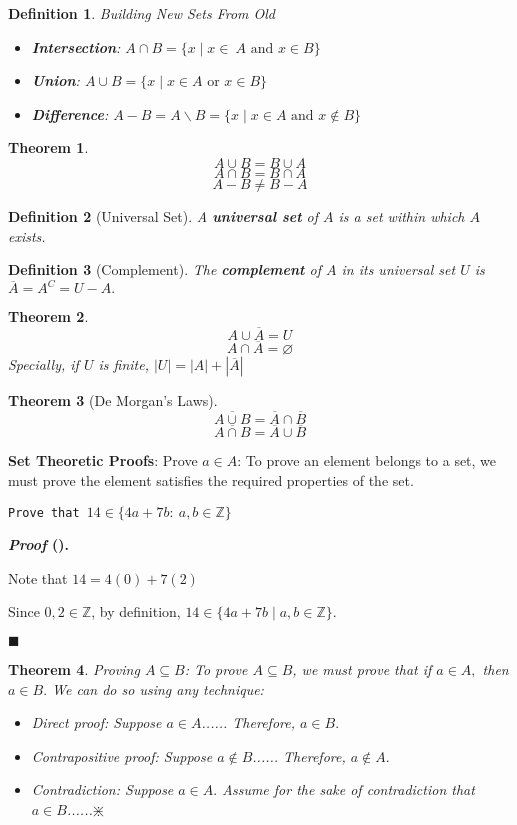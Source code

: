 \documentclass[12pt,a4paper]{article}
\newtheorem{thm}{Theorem}[subsection]
\newtheorem{df}{Definition}[subsection]
\newcounter{nprf}[subsection]
\newenvironment*{prf}{\par\indent\textbf{\textit{Proof} (\stepcounter{nprf}\thenprf). }\par }{\par\hfill $\blacksquare$\par}
\def\Z{{\mathbb{Z}}}
\def\emptyset{\varnothing}
\begin{document}
\begin{df}
	Building New Sets From Old
	\begin{itemize}
		\item \textbf{Intersection}: $A\cap B=\{x\mid x\in\ A\text{ and }x\in B\}$
		\item \textbf{Union}: $A\cup B=\{x\mid x\in A\text{ or }x\in B\}$
		\item \textbf{Difference}: $A-B=A\backslash B=\{x\mid x\in A\text{ and }x\notin B\}$
	\end{itemize}
\end{df}
\begin{thm}
	\[A\cup B=B\cup A\]	
	\[A\cap B=B\cap A\]
	\[A-B\neq B-A\]
\end{thm}
\begin{df}[Universal Set]
	A \textbf{universal set} of $A$ is a set within which $A$ exists.	
\end{df}
\begin{df}[Complement]
	The \textbf{complement} of $A$ in its universal set $U$ is $\overline{A}=A^{C}=U-A.$	
\end{df}
\begin{thm}
	\[A\cup\overline{A}=U\]
	\[A\cap\overline{A}=\emptyset\]	
	Specially, if $U$ is finite, $|U|=|A|+|\overline{A}|$
\end{thm}
\begin{thm}[De Morgan's Laws]
	\[\overline{A\cup B}=\overline{A}\cap\overline{B}\]	
	\[\overline{A\cap B}=\overline{A}\cup\overline{B}\]
\end{thm}
\textbf{Set Theoretic Proofs}: Prove $a\in A$: To prove an element belongs to a set, we must prove the element satisfies the required properties of the set. 
\begin{framed}
\noindent\texttt{Prove that $14\in\{4a+7b:\ a,b\in\Z\}$}	
\begin{prf}
	Note that $14=4(0)+7(2)$\par Since $0,2\in\Z$, by definition, $14\in\{4a+7b\mid a,b\in\Z\}.$
\end{prf}
\end{framed}
\begin{thm}
	Proving $A\subseteq B$: To prove $A\subseteq B$, we must prove that if $a\in A,$ then $a\in B.$ We can do so using any technique:
	\begin{itemize}
		\item Direct proof: Suppose $a\in A$...... Therefore, $a\in B.$
		\item Contrapositive proof: Suppose $a\notin B$...... Therefore, $a\notin A.$
		\item Contradiction: Suppose $a\in A.$ Assume for the sake of contradiction that $a\in B$......$\divideontimes$
	\end{itemize}	
\end{thm}
\end{document}
